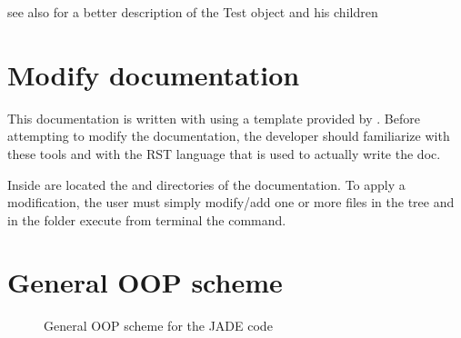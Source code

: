 \documentclass[letterpaper,10pt,english]{sphinxmanual}
\let\sphinxpxdimen\pdfpxdimen\else\newdimen\sphinxpxdimen
\begin{document}
\nopagebreak


\sphinxAtStartPar
see also {\hyperref[\detokenize{api/inputgeneration:testrunmodule}]{}} for a better description of the Test object and his children




\chapter{Modify documentation}
\label{\detokenize{dev/docmodify:modify-documentation}}\label{\detokenize{dev/docmodify::doc}}
\sphinxAtStartPar
This documentation is written with
 using a template
provided by . Before attempting
to modify the documentation, the developer should familiarize with these tools
and with the RST language that is used to actually write the doc.

\sphinxAtStartPar
Inside  are located the  and  directories
of the documentation. To apply a modification, the user must simply modify/add one
or more files in the  tree and in the  folder execute from terminal
the  command.


\chapter{General OOP scheme}
\label{\detokenize{api/general:general-oop-scheme}}\label{\detokenize{api/general::doc}}
\begin{figure}[htbp]
\centering
\capstart

\noindent\sphinxincludegraphics[width=600\sphinxpxdimen]{{OOPscheme}.png}
\caption{General OOP scheme for the JADE code}\label{\detokenize{api/general:id1}}\end{figure}
\end{document}

